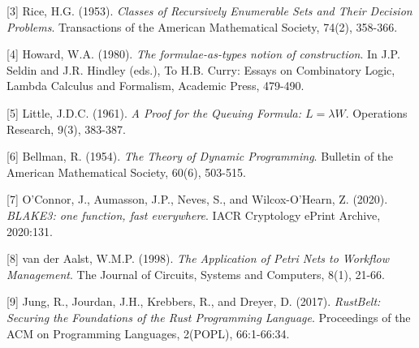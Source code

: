 \documentclass[
  12pt,
]{report}
\begin{document}
{[}3{]} Rice, H.G. (1953). \emph{Classes of Recursively Enumerable Sets
and Their Decision Problems}. Transactions of the American Mathematical
Society, 74(2), 358-366.

{[}4{]} Howard, W.A. (1980). \emph{The formulae-as-types notion of
construction}. In J.P. Seldin and J.R. Hindley (eds.), To H.B. Curry:
Essays on Combinatory Logic, Lambda Calculus and Formalism, Academic
Press, 479-490.

{[}5{]} Little, J.D.C. (1961). \emph{A Proof for the Queuing Formula:
\(L = \lambda W\)}. Operations Research, 9(3), 383-387.

{[}6{]} Bellman, R. (1954). \emph{The Theory of Dynamic Programming}.
Bulletin of the American Mathematical Society, 60(6), 503-515.

{[}7{]} O'Connor, J., Aumasson, J.P., Neves, S., and Wilcox-O'Hearn, Z.
(2020). \emph{BLAKE3: one function, fast everywhere}. IACR Cryptology
ePrint Archive, 2020:131.

{[}8{]} van der Aalst, W.M.P. (1998). \emph{The Application of Petri
Nets to Workflow Management}. The Journal of Circuits, Systems and
Computers, 8(1), 21-66.

{[}9{]} Jung, R., Jourdan, J.H., Krebbers, R., and Dreyer, D. (2017).
\emph{RustBelt: Securing the Foundations of the Rust Programming
Language}. Proceedings of the ACM on Programming Languages, 2(POPL),
66:1-66:34.
\end{document}
